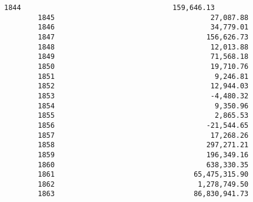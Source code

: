 \documentclass[11pt]{article}
\begin{document}
\begin{Verbatim}[commandchars=\\\{\}]
        1844                                    159,646.13   
        1845                                     27,087.88   
        1846                                     34,779.01   
        1847                                    156,626.73   
        1848                                     12,013.88   
        1849                                     71,568.18   
        1850                                     19,710.76   
        1851                                      9,246.81   
        1852                                     12,944.03   
        1853                                     -4,480.32   
        1854                                      9,350.96   
        1855                                      2,865.53   
        1856                                    -21,544.65   
        1857                                     17,268.26   
        1858                                    297,271.21   
        1859                                    196,349.16   
        1860                                    638,330.35   
        1861                                 65,475,315.90   
        1862                                  1,278,749.50   
        1863                                 86,830,941.73   
        

\end{Verbatim}
\end{document}
